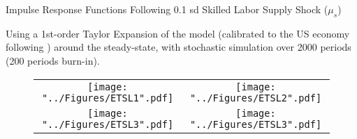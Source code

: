 \documentclass[compress,xcolor=dvipsnames]{beamer}
\begin{document}
\begin{frame}
\begin{footnotesize}
Impulse Response Functions Following 0.1 sd Skilled Labor Supply Shock ($\mu_s$)\\ \vspace{1mm}
{\tiny Using a 1st-order Taylor Expansion of the model (calibrated to the US economy following \citet{Anzoategui2017}) around the steady-state, with stochastic simulation over 2000 periods (200 periods burn-in).\par}
\end{footnotesize} \vspace{-2mm}
\begin{figure}[h!]
\centering
\begin{adjustbox}{center}
\begin{tabular}{cc}
\texttt{[image: "../Figures/ETSL1".pdf]} & %
\texttt{[image: "../Figures/ETSL2".pdf]} \\ %
\texttt{[image: "../Figures/ETSL3".pdf]} &
\texttt{[image: "../Figures/ETSL3".pdf]} %
\end{tabular}
\end{adjustbox}
\end{figure}
\end{frame}
\end{document}
